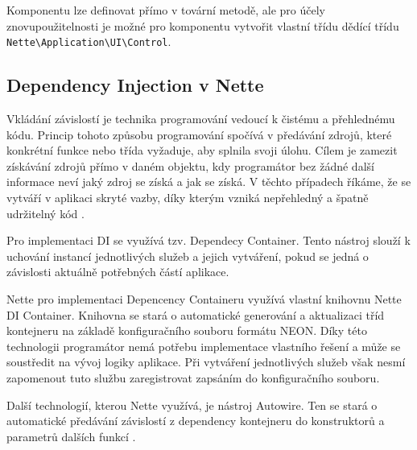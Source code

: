 \documentclass[czech,BP]{thesiskiv}
\begin{document}
		\par Komponentu lze definovat přímo v tovární metodě, ale pro účely znovupoužitelnosti je možné pro komponentu vytvořit vlastní třídu dědící třídu \texttt{Nette\textbackslash Application\textbackslash UI\textbackslash Control}.
		
		\subsection{Dependency Injection v Nette}
		\par Vkládání závislostí je technika programování vedoucí k čistému a přehlednému kódu. Princip tohoto způsobu programování spočívá v předávání zdrojů, které konkrétní funkce nebo třída vyžaduje, aby splnila svoji úlohu. Cílem je zamezit získávání zdrojů přímo v daném objektu, kdy programátor bez žádné další informace neví jaký zdroj se získá a jak se získá. V těchto případech říkáme, že se vytváří v aplikaci skryté vazby, díky kterým vzniká nepřehledný a špatně udržitelný kód \cite{PHP-DI}.
		\par Pro implementaci DI se využívá tzv. Dependecy Container. Tento nástroj slouží k uchování instancí jednotlivých služeb a jejich vytváření, pokud se jedná o závislosti aktuálně potřebných částí aplikace.
		\par Nette pro implementaci Depencency Containeru využívá vlastní knihovnu Nette DI Container. Knihovna se stará o automatické generování a aktualizaci tříd kontejneru na základě konfiguračního souboru formátu NEON. Díky této technologii programátor nemá potřebu implementace vlastního řešení a může se soustředit na vývoj logiky aplikace. Při vytváření jednotlivých služeb však nesmí zapomenout tuto službu zaregistrovat zapsáním do konfiguračního souboru.
		\par Další technologií, kterou Nette využívá, je nástroj Autowire. Ten se stará o automatické předávání závislostí z dependency kontejneru do konstruktorů a parametrů dalších funkcí \cite{NetteDI}.
		
\end{document}
